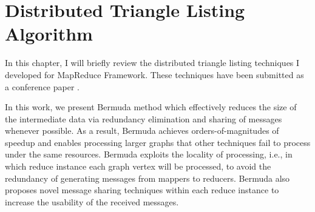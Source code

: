 \chapter{Distributed Triangle Listing Algorithm}
\label{chp:bec}
In this chapter, I will briefly review the distributed triangle listing techniques I developed for MapReduce Framework. These techniques have been submitted as a conference paper \cite{}.

In this work, we present Bermuda method which effectively reduces the size of the intermediate data via redundancy elimination and sharing of messages whenever possible. As a result, Bermuda achieves orders-of-magnitudes of speedup and enables processing larger graphs that other techniques fail to process under the same resources. Bermuda exploits the locality of processing, i.e.,  in which reduce instance each graph vertex will be processed, to avoid the redundancy of generating messages from mappers to reducers. Bermuda also proposes novel message sharing techniques within each reduce instance to increase the usability of the received messages. 



